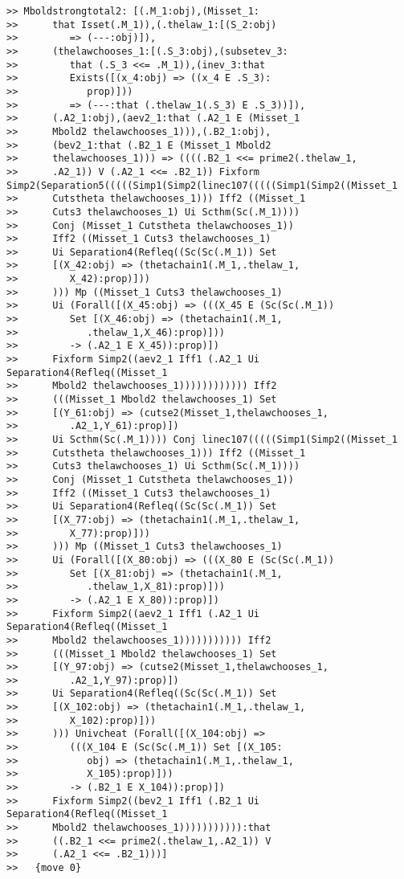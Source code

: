 \documentclass[12pt]{article}
\begin{document}
\begin{verbatim}
>> Mboldstrongtotal2: [(.M_1:obj),(Misset_1:
>>      that Isset(.M_1)),(.thelaw_1:[(S_2:obj)
>>         => (---:obj)]),
>>      (thelawchooses_1:[(.S_3:obj),(subsetev_3:
>>         that (.S_3 <<= .M_1)),(inev_3:that
>>         Exists([(x_4:obj) => ((x_4 E .S_3):
>>            prop)]))
>>         => (---:that (.thelaw_1(.S_3) E .S_3))]),
>>      (.A2_1:obj),(aev2_1:that (.A2_1 E (Misset_1
>>      Mbold2 thelawchooses_1))),(.B2_1:obj),
>>      (bev2_1:that (.B2_1 E (Misset_1 Mbold2
>>      thelawchooses_1))) => ((((.B2_1 <<= prime2(.thelaw_1,
>>      .A2_1)) V (.A2_1 <<= .B2_1)) Fixform Simp2(Separation5(((((Simp1(Simp2(linec107(((((Simp1(Simp2((Misset_1
>>      Cutstheta thelawchooses_1))) Iff2 ((Misset_1
>>      Cuts3 thelawchooses_1) Ui Scthm(Sc(.M_1))))
>>      Conj (Misset_1 Cutstheta thelawchooses_1))
>>      Iff2 ((Misset_1 Cuts3 thelawchooses_1)
>>      Ui Separation4(Refleq((Sc(Sc(.M_1)) Set
>>      [(X_42:obj) => (thetachain1(.M_1,.thelaw_1,
>>         X_42):prop)]))
>>      ))) Mp ((Misset_1 Cuts3 thelawchooses_1)
>>      Ui (Forall([(X_45:obj) => (((X_45 E (Sc(Sc(.M_1))
>>         Set [(X_46:obj) => (thetachain1(.M_1,
>>            .thelaw_1,X_46):prop)]))
>>         -> (.A2_1 E X_45)):prop)])
>>      Fixform Simp2((aev2_1 Iff1 (.A2_1 Ui Separation4(Refleq((Misset_1
>>      Mbold2 thelawchooses_1)))))))))))) Iff2
>>      (((Misset_1 Mbold2 thelawchooses_1) Set
>>      [(Y_61:obj) => (cutse2(Misset_1,thelawchooses_1,
>>         .A2_1,Y_61):prop)])
>>      Ui Scthm(Sc(.M_1)))) Conj linec107(((((Simp1(Simp2((Misset_1
>>      Cutstheta thelawchooses_1))) Iff2 ((Misset_1
>>      Cuts3 thelawchooses_1) Ui Scthm(Sc(.M_1))))
>>      Conj (Misset_1 Cutstheta thelawchooses_1))
>>      Iff2 ((Misset_1 Cuts3 thelawchooses_1)
>>      Ui Separation4(Refleq((Sc(Sc(.M_1)) Set
>>      [(X_77:obj) => (thetachain1(.M_1,.thelaw_1,
>>         X_77):prop)]))
>>      ))) Mp ((Misset_1 Cuts3 thelawchooses_1)
>>      Ui (Forall([(X_80:obj) => (((X_80 E (Sc(Sc(.M_1))
>>         Set [(X_81:obj) => (thetachain1(.M_1,
>>            .thelaw_1,X_81):prop)]))
>>         -> (.A2_1 E X_80)):prop)])
>>      Fixform Simp2((aev2_1 Iff1 (.A2_1 Ui Separation4(Refleq((Misset_1
>>      Mbold2 thelawchooses_1))))))))))) Iff2
>>      (((Misset_1 Mbold2 thelawchooses_1) Set
>>      [(Y_97:obj) => (cutse2(Misset_1,thelawchooses_1,
>>         .A2_1,Y_97):prop)])
>>      Ui Separation4(Refleq((Sc(Sc(.M_1)) Set
>>      [(X_102:obj) => (thetachain1(.M_1,.thelaw_1,
>>         X_102):prop)]))
>>      ))) Univcheat (Forall([(X_104:obj) =>
>>         (((X_104 E (Sc(Sc(.M_1)) Set [(X_105:
>>            obj) => (thetachain1(.M_1,.thelaw_1,
>>            X_105):prop)]))
>>         -> (.B2_1 E X_104)):prop)])
>>      Fixform Simp2((bev2_1 Iff1 (.B2_1 Ui Separation4(Refleq((Misset_1
>>      Mbold2 thelawchooses_1))))))))))):that
>>      ((.B2_1 <<= prime2(.thelaw_1,.A2_1)) V
>>      (.A2_1 <<= .B2_1)))]
>>   {move 0}



\end{verbatim}
\end{document}
